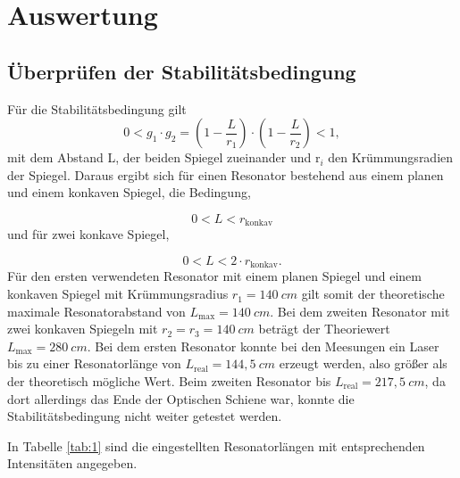 \section{Auswertung}
\label{sec:Auswertung}

\subsection{Überprüfen der Stabilitätsbedingung}
\label{sec:Überprüfen der Stabilitätsbesingung}

Für die Stabilitätsbedingung gilt 
\begin{equation}
  0 < g_1 \cdot g_2 = \left(1 - \frac{L}{r_1}\right) \cdot \left(1- \frac{L}{r_2}\right) < 1,
\end{equation}
mit dem Abstand L, der beiden Spiegel zueinander und r$_i$ den Krümmungsradien der Spiegel.
Daraus ergibt sich für einen Resonator bestehend aus einem planen und einem konkaven Spiegel, 
die Bedingung,

\begin{equation}
\label{equ:}
  0 < L < r_{\text{konkav}}
\end{equation}
und für zwei konkave Spiegel,

\begin{equation}
\label{equ:}
  0 < L < 2 \cdot r_{\text{konkav}}.
\end{equation}
Für den ersten verwendeten Resonator mit einem planen Spiegel und einem konkaven Spiegel mit Krümmungsradius $r_1 = 140 \: cm$ gilt somit der 
theoretische maximale Resonatorabstand von $L_{\text{max}} = 140 \: cm$.
Bei dem zweiten Resonator mit zwei konkaven Spiegeln mit $r_2 = r_3 = 140 \: cm$ beträgt der Theoriewert $L_{\text{max}} = 280 \: cm$.
Bei dem ersten Resonator konnte bei den Meesungen ein Laser bis zu einer Resonatorlänge von $L_{\text{real}} = 144,5 \: cm$ erzeugt werden,
also größer als der theoretisch mögliche Wert.
Beim zweiten Resonator bis $L_{\text{real}} = 217,5 \: cm$, da dort allerdings das Ende der Optischen Schiene war, konnte die Stabilitätsbedingung nicht weiter getestet werden.

In Tabelle \ref{tab:1} sind die eingestellten Resonatorlängen mit entsprechenden Intensitäten angegeben.



